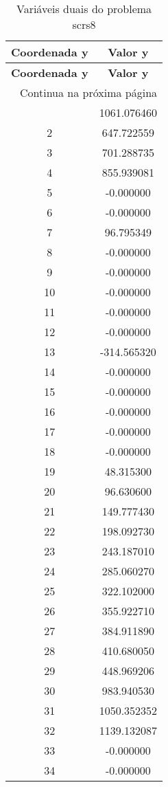 \documentclass[12pt]{article}
\begin{document}
\begin{longtable}{@{}cc@{}}
\caption{Variáveis duais do problema scrs8} \\
\toprule
\textbf{Coordenada y} & \textbf{Valor y} \\
\midrule
\endfirsthead

\toprule
\textbf{Coordenada y} & \textbf{Valor y} \\
\midrule
\endhead

\midrule \multicolumn{2}{r}{{Continua na próxima página}} \\ \midrule
\endfoot

\bottomrule
\endlastfoot
1 & 1061.076460 \\
2 & 647.722559 \\
3 & 701.288735 \\
4 & 855.939081 \\
5 & -0.000000 \\
6 & -0.000000 \\
7 & 96.795349 \\
8 & -0.000000 \\
9 & -0.000000 \\
10 & -0.000000 \\
11 & -0.000000 \\
12 & -0.000000 \\
13 & -314.565320 \\
14 & -0.000000 \\
15 & -0.000000 \\
16 & -0.000000 \\
17 & -0.000000 \\
18 & -0.000000 \\
19 & 48.315300 \\
20 & 96.630600 \\
21 & 149.777430 \\
22 & 198.092730 \\
23 & 243.187010 \\
24 & 285.060270 \\
25 & 322.102000 \\
26 & 355.922710 \\
27 & 384.911890 \\
28 & 410.680050 \\
29 & 448.969206 \\
30 & 983.940530 \\
31 & 1050.352352 \\
32 & 1139.132087 \\
33 & -0.000000 \\
34 & -0.000000 \\

\end{longtable}
\end{document}
